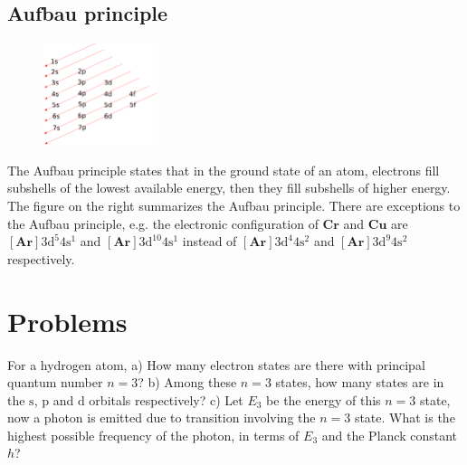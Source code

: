 \documentclass[12pt]{book} %
\numberwithin{equation}{chapter}
\begin{document}
\subsection*{Aufbau principle}
\begin{figure}
\vspace{-1cm}
\centering
\includegraphics[width=0.3\textwidth]{Aufbau principle}
\end{figure}
The Aufbau principle states that in the ground state of an atom, electrons fill subshells of the lowest available energy, then they fill subshells of higher energy. The figure on the right summarizes the Aufbau principle.\bigskip\newline
There are exceptions to the Aufbau principle, e.g. the electronic configuration of $\mathbf{Cr}$ and $\mathbf{Cu}$ are $[\mathbf{Ar}]3\text{d}^{5}4\text{s}^{1}$ and $[\mathbf{Ar}]3\text{d}^{10}4\text{s}^{1}$ instead of $[\mathbf{Ar}]3\text{d}^{4}4\text{s}^{2}$ and $[\mathbf{Ar}]3\text{d}^{9}4\text{s}^{2}$ respectively.


\section*{Problems}
\begin{problem}
For a hydrogen atom,\bigskip\newline
a) How many electron states are there with principal quantum number $n=3$?\bigskip\newline
b) Among these $n=3$ states, how many states are in the $\text{s}$, $\text{p}$ and $\text{d}$ orbitals respectively?\bigskip\newline
c) Let $E_{3}$ be the energy of this $n=3$ state, now a photon is emitted due to transition involving the $n=3$ state. What is the highest possible frequency of the photon, in terms of $E_{3}$ and the Planck constant $h$?
\end{problem}
\end{document}

